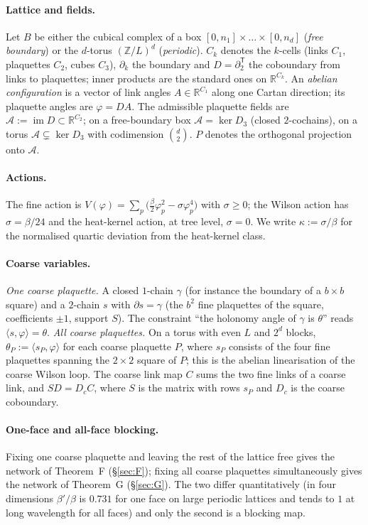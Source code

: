 \documentclass[11pt,a4paper]{article}
\theoremstyle{definition}
\theoremstyle{remark}
\newcommand{\R}{\mathbb{R}}
\newcommand{\cA}{\mathcal{A}}
\newcommand{\im}{\operatorname{im}}
\begin{document}
\paragraph{Lattice and fields.}
Let $B$ be either the cubical complex of a box $[0,n_1]\times\dots\times[0,n_d]$ (\emph{free boundary}) or the $d$-torus $(\mathbb{Z}/L)^d$ (\emph{periodic}).
$C_k$ denotes the $k$-cells (links $C_1$, plaquettes $C_2$, cubes $C_3$), $\partial_k$ the boundary and $D=\partial_2^{\mathsf T}$ the coboundary from links to plaquettes; inner products are the standard ones on $\R^{C_k}$.
An \emph{abelian configuration} is a vector of link angles $A\in\R^{C_1}$ along one Cartan direction; its plaquette angles are $\varphi=DA$.
The admissible plaquette fields are $\cA:=\im D\subset\R^{C_2}$; on a free-boundary box $\cA=\ker D_3$ (closed $2$-cochains), on a torus $\cA\subsetneq\ker D_3$ with codimension $\binom d2$.
$P$ denotes the orthogonal projection onto $\cA$.

\paragraph{Actions.}
The fine action is $V(\varphi)=\sum_p\bigl(\frac\beta2\varphi_p^2-\sigma\varphi_p^4\bigr)$ with $\sigma\ge0$; the Wilson action has $\sigma=\beta/24$ and the heat-kernel action, at tree level, $\sigma=0$.
We write $\kappa:=\sigma/\beta$ for the normalised quartic deviation from the heat-kernel class.

\paragraph{Coarse variables.}
\emph{One coarse plaquette.} A closed $1$-chain $\gamma$ (for instance the boundary of a $b\times b$ square) and a $2$-chain $s$ with $\partial s=\gamma$ (the $b^2$ fine plaquettes of the square, coefficients $\pm1$, support $S$). The constraint ``the holonomy angle of $\gamma$ is $\theta$'' reads $\langle s,\varphi\rangle=\theta$.
\emph{All coarse plaquettes.} On a torus with even $L$ and $2^d$ blocks, $\theta_P:=\langle s_P,\varphi\rangle$ for each coarse plaquette $P$, where $s_P$ consists of the four fine plaquettes spanning the $2\times2$ square of $P$; this is the abelian linearisation of the coarse Wilson loop.
The coarse link map $C$ sums the two fine links of a coarse link, and $SD=D_cC$, where $S$ is the matrix with rows $s_P$ and $D_c$ is the coarse coboundary.

\paragraph{One-face and all-face blocking.}
Fixing one coarse plaquette and leaving the rest of the lattice free gives the network of Theorem~F (\S\ref{sec:F}); fixing all coarse plaquettes simultaneously gives the network of Theorem~G (\S\ref{sec:G}).
The two differ quantitatively (in four dimensions $\beta'/\beta$ is $0.731$ for one face on large periodic lattices and tends to $1$ at long wavelength for all faces) and only the second is a blocking map.
\end{document}
